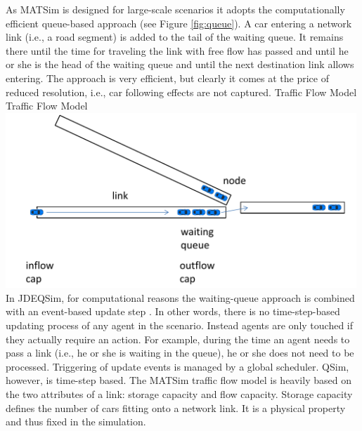 As MATSim is designed for large-scale scenarios it adopts the computationally efficient queue-based approach (see Figure \ref{fig:queue}). A car entering a network link (i.e., a road segment) is added to the tail of the waiting queue. It remains there until the time for traveling the link with free flow has passed and until he or she is the head of the waiting queue and until the next destination link allows entering. The approach is very efficient, but clearly it comes at the price of reduced resolution, i.e., car following effects are not captured.   
%
\createfigure%
{Traffic Flow Model}%
{Traffic Flow Model}%
{\label{fig:queue}}%
{\includegraphics[width=0.99\textwidth, angle=0]{using/figures/queue.pdf}}%
{}
%
In JDEQSim, for computational reasons the waiting-queue approach is combined with an event-based update step \citep[][]{CharyparEtAl_TRB_2009}. In other words, there is no time-step-based updating process of any agent in the scenario. Instead agents are only touched if they actually require an action. For example, during the time an agent needs to pass a link (i.e., he or she is waiting in the queue), he or she does not need to be processed.  
%
Triggering of update events is managed by a global scheduler. 
QSim, however, is time-step based. 
%
%
%
The MATSim traffic flow model is heavily based on the two attributes of a link: storage capacity and flow capacity. Storage capacity defines the number of cars fitting onto a network link. It is a physical property and thus fixed in the simulation. 

